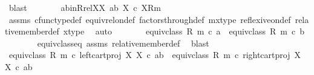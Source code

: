 \begin{isabellebody}
\ blast\isanewline
\ \ \ \ \isamarkupfalse%
\ \isamarkupfalse%
\ ab{\isacharunderscore}{\kern0pt}inR{\isacharunderscore}{\kern0pt}relXX{\isacharcolon}{\kern0pt}\ {\isachardoublequoteopen}{\isasymlangle}a{\isacharcomma}{\kern0pt}b{\isasymrangle}\ {\isasymin}\isactrlbsub X\ {\isasymtimes}\isactrlsub c\ X\isactrlesub {\isacharparenleft}{\kern0pt}R{\isacharcomma}{\kern0pt}m{\isacharparenright}{\kern0pt}{\isachardoublequoteclose}\isanewline
\ \ \ \ \ \ \isamarkupfalse%
\ assms\ cfunc{\isacharunderscore}{\kern0pt}type{\isacharunderscore}{\kern0pt}def\ equiv{\isacharunderscore}{\kern0pt}rel{\isacharunderscore}{\kern0pt}on{\isacharunderscore}{\kern0pt}def\ factors{\isacharunderscore}{\kern0pt}through{\isacharunderscore}{\kern0pt}def\ m{\isacharunderscore}{\kern0pt}x{\isacharunderscore}{\kern0pt}type\ reflexive{\isacharunderscore}{\kern0pt}on{\isacharunderscore}{\kern0pt}def\ relative{\isacharunderscore}{\kern0pt}member{\isacharunderscore}{\kern0pt}def{}\ x{\isacharunderscore}{\kern0pt}type\ \isamarkupfalse%
\ auto\isanewline
\ \ \ \ \isamarkupfalse%
\ \isamarkupfalse%
\ {\isachardoublequoteopen}equiv{\isacharunderscore}{\kern0pt}class\ {\isacharparenleft}{\kern0pt}R{\isacharcomma}{\kern0pt}\ m{\isacharparenright}{\kern0pt}\ {\isasymcirc}\isactrlsub c\ a\ {\isacharequal}{\kern0pt}\ equiv{\isacharunderscore}{\kern0pt}class\ {\isacharparenleft}{\kern0pt}R{\isacharcomma}{\kern0pt}\ m{\isacharparenright}{\kern0pt}\ {\isasymcirc}\isactrlsub c\ b{\isachardoublequoteclose}\isanewline
\ \ \ \ \ \ \isamarkupfalse%
\ equiv{\isacharunderscore}{\kern0pt}class{\isacharunderscore}{\kern0pt}eq\ assms\ relative{\isacharunderscore}{\kern0pt}member{\isacharunderscore}{\kern0pt}def\ \isamarkupfalse%
\ blast\isanewline
\ \ \ \ \isamarkupfalse%
\ \isamarkupfalse%
\ {\isachardoublequoteopen}equiv{\isacharunderscore}{\kern0pt}class\ {\isacharparenleft}{\kern0pt}R{\isacharcomma}{\kern0pt}\ m{\isacharparenright}{\kern0pt}\ {\isasymcirc}\isactrlsub c\ left{\isacharunderscore}{\kern0pt}cart{\isacharunderscore}{\kern0pt}proj\ X\ X\ {\isasymcirc}\isactrlsub c\ {\isasymlangle}a{\isacharcomma}{\kern0pt}b{\isasymrangle}\ {\isacharequal}{\kern0pt}\ equiv{\isacharunderscore}{\kern0pt}class\ {\isacharparenleft}{\kern0pt}R{\isacharcomma}{\kern0pt}\ m{\isacharparenright}{\kern0pt}\ {\isasymcirc}\isactrlsub c\ right{\isacharunderscore}{\kern0pt}cart{\isacharunderscore}{\kern0pt}proj\ X\ X\ {\isasymcirc}\isactrlsub c\ {\isasymlangle}a{\isacharcomma}{\kern0pt}b{\isasymrangle}{\isachardoublequoteclose}\isanewline

\end{isabellebody}
